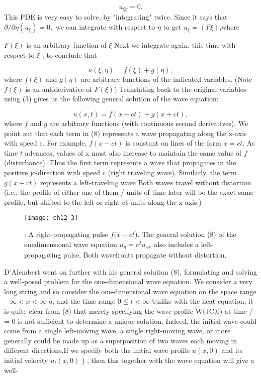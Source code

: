 \documentclass[../main.tex]{subfiles}
\begin{document}
\begin{equation}
u_{\xi \eta}=0.
\label{eq:eps}
\end{equation}
This PDE is very easy to solve, by "integrating" twice. Since it says that $\partial /\partial \eta(u_\xi)=0,$ we can integrate with respect to $\eta$ to get $u_\xi=(F\xi)$,where

\newpage
$F(\xi)$  is an arbitrary function of $\xi$ Next we integrate again, this time with respect
to $\xi$ , to conclude that

\begin{equation}
u(\xi,\eta)=f(\xi)+g(\eta),
\label{eq:eps}
\end{equation}
where $f(\xi)$ and $g(\eta)$ are arbitrary functions of the indicated variables. (Note  $f(\xi)$ is an antiderivative of $F(\xi)$) Translating back to the original variables
using (3) gives us the following general solution of the wave equation:

\begin{equation}
u(x,t)=f(x-ct)+g(x + ct),
\label{eq:eps}
\end{equation}
where $f$ and $g$ are arbitrary functions (with continuous second derivatives). We
point out that each term in (8) represents a wave propagating along the x-axis with
speed c. For example,  $f(x-ct)$  is constant on lines of the form $x = ct$. As time $t$
advances, values of x must also increase to maintain the same value of $f$ (disturbance). Thus the first term represents a wave that propagates in the positive
jc-direction with speed c (right traveling wave). Similarly, the term
$g(x + ct)$ represents a left-traveling wave Both waves travel without distortion
(i.e., the profile of either one of them / units of time later will be the exact same
profile, but shifted to the left or right ct units along the x-axis.)

\begin{figure}[H]
	\centering
	\texttt{[image: ch12\_3]}
	\caption{\textsf{: A right-propagating pulse $f(x - ct$). The general solution (8) of the onedimensional wave equation $u_\eta = c^2 u_{xx}$
also includes a left-propagating pulse. Both
wavefronts propagate without distortion.}}
	\label{pfig:ch12_3}
\end{figure}

D'Alembert went on further with his general solution (8), formulating and
solving a well-posed problem for the one-dimensional wave equation. We
consider a very long string and so consider the one-dimensional wave equation on
the space range $ -\infty <x< \infty$ o, and the time range $ 0 \leqslant t < \infty $ 
Unlike with the heat
equation, it is quite clear from (8) that merely specifying the wave profile W(JC,0) at
time / = 0 is not sufficient to determine a unique solution. Indeed, the initial wave
could come from a single left-moving wave, a single right-moving wave, or more
generally could be made up as a superposition of two waves each moving in
different directions.If we specify both the initial wave profile $u(x,0)$ and its
initial velocity $u_t(x,0)$ ) , then this together with the wave equation will give a well-
\end{document}
